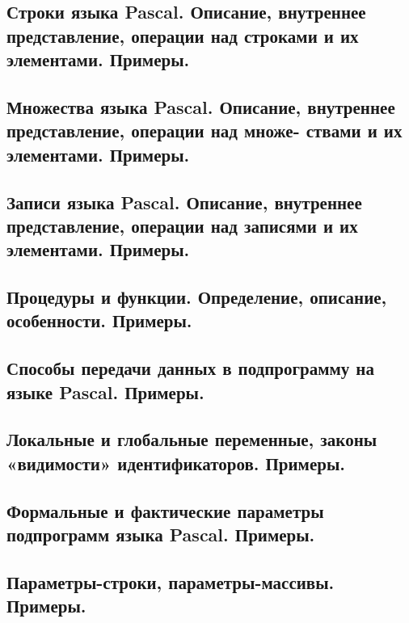 \documentclass[a4paper, 10pt]{article}
\begin{document}
\subsection{Строки языка Pascal. Описание, внутреннее представление, операции над строками и их 
элементами. Примеры. }



\subsection{Множества  языка  Pascal.  Описание,  внутреннее  представление,  операции  над  множе-
ствами и их элементами. Примеры. }



\subsection{Записи языка Pascal. Описание, внутреннее представление, операции над записями и их 
элементами. Примеры. }



\subsection{Процедуры и функции. Определение, описание, особенности. Примеры. }



\subsection{Способы передачи данных в подпрограмму на языке Pascal. Примеры. }



\subsection{Локальные и глобальные переменные, законы «видимости» идентификаторов. Примеры. }



\subsection{Формальные и фактические параметры подпрограмм языка Pascal. Примеры. }



\subsection{Параметры-строки, параметры-массивы. Примеры. }
\end{document}
